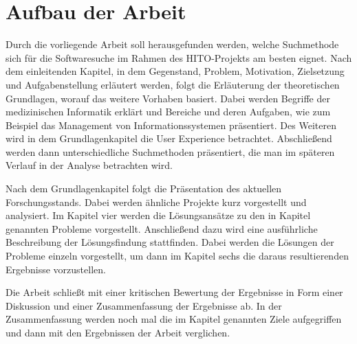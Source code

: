 



\section{Aufbau der Arbeit}\label{sec:aufbau}

Durch die vorliegende Arbeit soll herausgefunden werden, welche Suchmethode sich für die Softwaresuche im Rahmen des HITO-Projekts am besten eignet. Nach dem einleitenden Kapitel, in dem Gegenstand, Problem, Motivation, Zielsetzung und Aufgabenstellung erläutert werden, folgt die Erläuterung der theoretischen Grundlagen, worauf das weitere Vorhaben basiert. Dabei werden Begriffe der medizinischen Informatik erklärt und Bereiche und deren Aufgaben, wie zum Beispiel das Management von Informationssystemen präsentiert. Des Weiteren wird in dem Grundlagenkapitel die User Experience betrachtet. Abschließend werden dann unterschiedliche Suchmethoden präsentiert, die man im späteren Verlauf in der Analyse betrachten wird.

Nach dem Grundlagenkapitel folgt die Präsentation des aktuellen Forschungsstands. Dabei werden ähnliche Projekte kurz vorgestellt und analysiert. Im Kapitel vier werden die Lösungsansätze zu den in Kapitel  genannten Probleme vorgestellt. Anschließend dazu wird eine ausführliche Beschreibung der Lösungsfindung stattfinden. Dabei werden die Lösungen der Probleme einzeln vorgestellt, um dann im Kapitel sechs die daraus resultierenden Ergebnisse vorzustellen.

Die Arbeit schließt mit einer kritischen Bewertung der Ergebnisse in Form einer Diskussion und einer Zusammenfassung der Ergebnisse ab. In der Zusammenfassung werden noch mal die im Kapitel  genannten Ziele aufgegriffen und dann mit den Ergebnissen der Arbeit verglichen.


